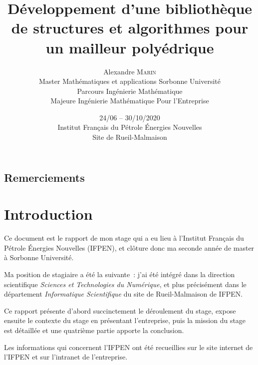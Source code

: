 \documentclass[12pt,a4paper,draft]{report}
\begin{document}
\begin{titlepage}
\author{Alexandre \textsc{Marin}\\ Master Mathématiques et applications Sorbonne Université\\ Parcours Ingénierie Mathématique\\ Majeure Ingénierie Mathématique Pour l'Entreprise}
\date{24/06 -- 30/10/2020\\ Institut Fran\c{c}ais du P\'etrole \'Energies Nouvelles\\ Site de Rueil-Malmaison}
\title{Développement d’une bibliothèque de structures et algorithmes pour un mailleur polyédrique}
\maketitle
\end{titlepage}

\begin{titlepage}
\section*{Remerciements}
\end{titlepage}

\begin{titlepage}
\tableofcontents
\end{titlepage}


\section{Introduction}
Ce document est le rapport de mon stage qui a eu lieu à l'Institut Français du Pétrole \'Energies Nouvelles (IFPEN), et clôture donc ma seconde année de master à Sorbonne Université.

Ma position de stagiaire a été la suivante~: j'ai été intégré dans la direction scientifique \emph{Sciences et Technologies du Numérique}, et plus précisément dans le département \emph{Informatique Scientifique} du site de Rueil-Malmaison de IFPEN.

Ce rapport présente d'abord succinctement le déroulement du stage, expose ensuite le contexte du stage en présentant l'entreprise, puis la mission du stage est détaillée et une quatrième partie apporte la conclusion.

Les informations qui concernent l'IFPEN ont été recueillies sur le site internet de l'IFPEN et sur l'intranet de l'entreprise.
\end{document}
